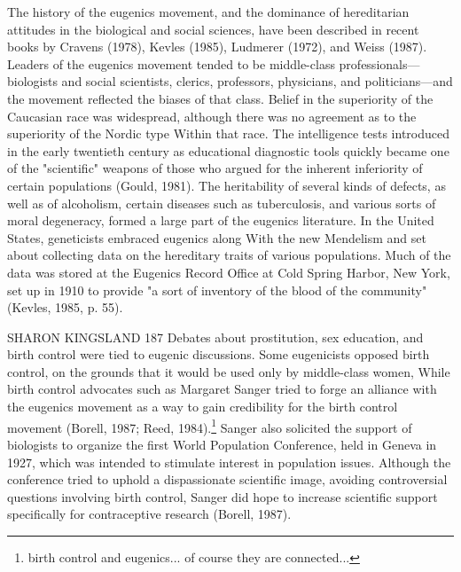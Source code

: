 \documentclass[12pt]{letter}
\begin{document}
The history of the eugenics movement, and the dominance of hereditarian attitudes in the biological and social sciences, have been described in recent books by Cravens (1978), Kevles (1985), Ludmerer (1972), and Weiss (1987). Leaders of the eugenics movement tended to be middle-class professionals—biologists and social scientists, clerics, professors, physicians, and politicians—and the movement reflected the biases of that class. Belief in the superiority of the Caucasian race was widespread, although there was no agreement as to the superiority of the Nordic type Within that race. The intelligence tests introduced in the early twentieth century as educational diagnostic tools quickly became one of the "scientific" weapons of those who argued for the inherent inferiority of certain populations (Gould, 1981). The heritability of several kinds of defects, as well as of alcoholism, certain diseases such as tuberculosis, and various sorts of moral degeneracy, formed a large part of the eugenics literature. In the United States, geneticists embraced eugenics along With the new Mendelism and set about collecting data on the hereditary traits of various populations. Much of the data was stored at the Eugenics Record Office at Cold Spring Harbor, New York, set up in 1910 to provide "a sort of inventory of the blood of the community" (Kevles, 1985, p. 55).

SHARON KINGSLAND 187
Debates about prostitution, sex education, and birth control were tied to eugenic discussions. Some eugenicists opposed birth control, on the grounds that it would be used only by middle-class women, While birth control advocates such as Margaret Sanger tried to forge an alliance with the eugenics movement as a way to gain credibility for the birth control movement (Borell, 1987; Reed, 1984).\footnote{birth control and eugenics... of course they are connected...} Sanger also solicited the support of biologists to organize the first World Population Conference, held in Geneva in 1927, which was intended to stimulate interest in population issues. Although the conference tried to uphold a dispassionate scientific image, avoiding controversial questions involving birth control, Sanger did hope to increase scientific support specifically for contraceptive research (Borell, 1987).
\end{document}
